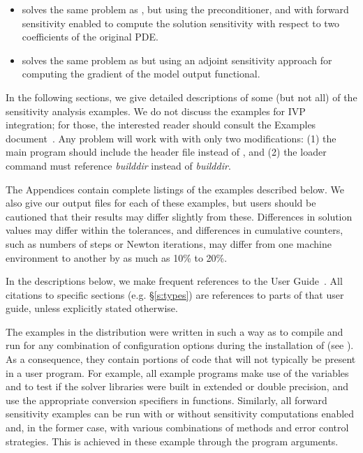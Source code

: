 \begin{itemize}
\item {}
  solves the same problem as , but using the {\idabbdpre}
  preconditioner, and with forward sensitivity enabled to compute the solution
  sensitivity with respect to two coefficients of the original PDE.
  

\item {}
  solves the same problem as  but using an adjoint
  sensitivity approach for computing the gradient of the model output functional.

\end{itemize}


\vspace{0.2in}\noindent
In the following sections, we give detailed descriptions of some (but
not all) of the sensitivity analysis examples. We do not discuss the 
examples for IVP integration; for those, the interested reader should consult
the {\ida} Examples document~\cite{ida_ex}. Any {\ida} problem
will work with {\idas} with only two modifications: (1) the main program
should include the header file  instead of , and
(2) the loader command must reference
{\em builddir} instead of
{\em builddir}.

The Appendices contain complete listings
of the examples described below.  We also give our output files for
each of these examples, but users should be cautioned that their
results may differ slightly from these.  Differences in solution
values may differ within the tolerances, and differences in cumulative
counters, such as numbers of steps or Newton iterations, may differ
from one machine environment to another by as much as 10\% to 20\%.

In the descriptions below, we make frequent references to the {\idas}
User Guide~\cite{idas_ug}.  All citations to specific sections
(e.g. \S\ref{s:types}) are references to parts of that user guide, unless
explicitly stated otherwise.

\vspace{0.2in}
The examples in the {\idas} distribution were written in such a way as
to compile and run for any combination of configuration options during
the installation of {\sundials} (see ). As a consequence,
they contain portions of code that will not typically be present in a
user program. For example, all example programs make use of the
variables  and 
to test if the solver libraries
were built in extended or double precision, and use the appropriate conversion 
specifiers in  functions. Similarly, all forward sensitivity
examples can be run with or without sensitivity computations enabled and,
in the former case, with various combinations of methods and error control 
strategies. This is achieved in these example through the program arguments.

